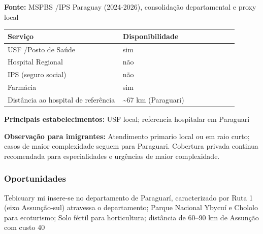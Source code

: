 \textbf{Fonte:} MSPBS /\allowbreak  IPS Paraguay (2024-2026), consolidação
departamental e proxy local

{\def\LTcaptype{none} %
\begin{longtable}{@{}>{\raggedright\arraybackslash}p{0.45\linewidth} >{\raggedright\arraybackslash}p{0.45\linewidth}@{}}
\toprule\noalign{}
Serviço & Disponibilidade \\
\midrule\noalign{}
\endhead
\bottomrule\noalign{}
\endlastfoot
USF /\allowbreak  Posto de Saúde & sim \\
Hospital Regional & não \\
IPS (seguro social) & não \\
Farmácia & sim \\
Distância ao hospital de referência & \textasciitilde67 km
(Paraguari) \\
\end{longtable}
}

\textbf{Principais estabelecimentos:} USF local; referencia hospitalar
em Paraguari

\textbf{Observação para imigrantes:} Atendimento primario local ou em
raio curto; casos de maior complexidade seguem para Paraguari. Cobertura
privada continua recomendada para especialidades e urgências de maior
complexidade.
\newpage

\subsubsection*{Oportunidades}\label{oport-tebicuary-mi-0914}
Tebicuary mi insere-se no departamento de Paraguarí, caracterizado por Ruta 1 (eixo Assunção-sul) atravessa o departamento; Parque Nacional Ybycuí e Chololo para ecoturismo; Solo fértil para horticultura; distância de 60–90 km de Assunção com custo 40%

